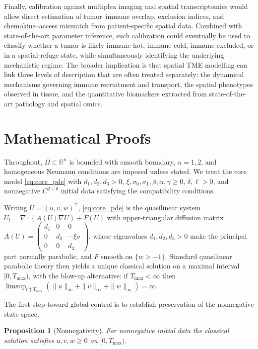 \documentclass[]{interact}
\theoremstyle{plain}%
\newtheorem{proposition}[theorem]{Proposition}
\theoremstyle{definition}
\theoremstyle{remark}
\newcommand{\R}{\mathbb{R}}
\newcommand{\Om}{\Omega}
\begin{document}
Finally, calibration against multiplex imaging and spatial transcriptomics would allow direct estimation of tumor--immune overlap, exclusion indices, and chemokine--access mismatch from patient-specific spatial data. Combined with state-of-the-art parameter inference, such calibration could eventually be used to classify whether a tumor is likely immune-hot, immune-cold, immune-excluded, or in a spatial-refuge state, while simultaneously identifying the underlying mechanistic regime. The broader implication is that spatial TME modelling can link three levels of description that are often treated separately: the dynamical mechanisms governing immune recruitment and transport, the spatial phenotypes observed in tissue, and the quantitative biomarkers extracted from
state-of-the-art pathology and spatial omics.

\appendix

\section{Mathematical Proofs}\label{app:analysis}

Throughout, $\Om\subset\R^n$ is bounded with smooth boundary, $n=1,2$, and
homogeneous Neumann conditions are imposed unless stated. We treat the core model
\eqref{eq:core_pde} with $d_1,d_2,d_3>0$, $\xi,\sigma_0,\sigma_1,\beta,\alpha,
\gamma\ge0$, $\delta,\ell>0$, and nonnegative $C^{2+\theta}$ initial data
satisfying the compatibility conditions.

Writing $U=(u,v,w)^\top$, \eqref{eq:core_pde} is the quasilinear system
$U_t=\nabla\!\cdot(A(U)\nabla U)+F(U)$ with upper-triangular diffusion matrix
$A(U)=\begin{pmatrix}d_1&0&0\\ 0&d_2&-\xi v\\ 0&0&d_3\end{pmatrix}$,
whose eigenvalues $d_1,d_2,d_3>0$ make the principal part normally parabolic, and
$F$ smooth on $\{w>-1\}$. Standard quasilinear parabolic theory then yields a
unique classical solution on a maximal interval $[0,T_{\max})$, with the blow-up
alternative: if $T_{\max}<\infty$ then
$\limsup_{t\uparrow T_{\max}}(\|u\|_\infty+\|v\|_\infty+\|w\|_\infty)=\infty$.

The first step toward global control is to establish preservation of the
nonnegative state space.

\begin{proposition}[Nonnegativity]\label{app:prop:positivity}
For nonnegative initial data the classical solution satisfies $u,v,w\ge0$ on
$[0,T_{\max})$.
\end{proposition}
\end{document}
